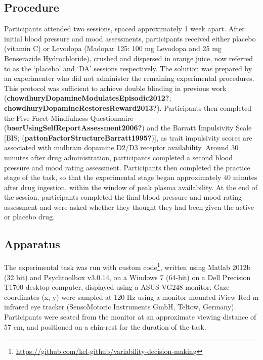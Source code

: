\documentclass{article}
\begin{document}
\hypertarget{procedure}{%
\subsection{Procedure}\label{procedure}}

Participants attended two sessions, spaced approximately 1 week apart.
After initial blood pressure and mood assessments, participants received
either placebo (vitamin C) or Levodopa (Madopar 125: 100 mg Levodopa and
25 mg Benserazide Hydrochloride), crushed and dispersed in orange juice,
now referred to as the `placebo' and `DA' sessions respectively. The
solution was prepared by an experimenter who did not administer the
remaining experimental procedures. This protocol was sufficient to
achieve double blinding in previous work
(\textbf{chowdhuryDopamineModulatesEpisodic2012?};
\textbf{chowdhuryDopamineRestoresReward2013?}). Participants then
completed the Five Facet Mindfulness Questionnaire
(\textbf{baerUsingSelfReportAssessment2006?}) and the Barratt
Impulsivity Scale {[}BIS;
(\textbf{pattonFactorStructureBarratt1995?}){]}, as trait impulsivity
scores are associated with midbrain dopamine D2/D3 receptor
availability. Around 30 minutes after drug administration, participants
completed a second blood pressure and mood rating assessment.
Participants then completed the practice stage of the task, so that the
experimental stage began approximately 40 minutes after drug ingestion,
within the window of peak plasma availability. At the end of the
session, participants completed the final blood pressure and mood rating
assessment and were asked whether they thought they had been given the
active or placebo drug.

\hypertarget{apparatus}{%
\subsection{Apparatus}\label{apparatus}}

The experimental task was run with custom code\footnote{\url{https://github.com/kel-github/variability-decision-making}},
written using Matlab 2012b (32 bit) and Psychtoolbox v3.0.14, on a
Windows 7 (64-bit) on a Dell Precision T1700 desktop computer, displayed
using a ASUS VG248 monitor. Gaze coordinates (x, y) were sampled at 120
Hz using a monitor-mounted iView Red-m infrared eye tracker
(SensoMotoric Instruments GmbH, Teltow, Germany). Participants were
seated from the monitor at an approximate viewing distance of 57 cm, and
positioned on a chin-rest for the duration of the task.
\end{document}
